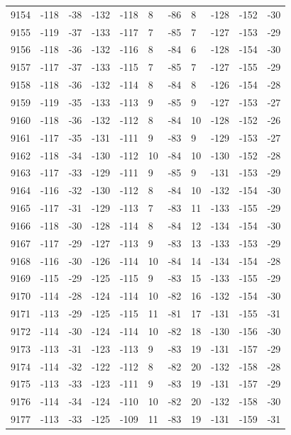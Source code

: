 \begin{table}[H]
\begin{tabular}{lllllllllll}
9154 & -118 & -38 & -132 & -118 & 8 & -86 & 8 & -128 & -152 & -30 \\
9155 & -119 & -37 & -133 & -117 & 7 & -85 & 7 & -127 & -153 & -29 \\
9156 & -118 & -36 & -132 & -116 & 8 & -84 & 6 & -128 & -154 & -30 \\
9157 & -117 & -37 & -133 & -115 & 7 & -85 & 7 & -127 & -155 & -29 \\
9158 & -118 & -36 & -132 & -114 & 8 & -84 & 8 & -126 & -154 & -28 \\
9159 & -119 & -35 & -133 & -113 & 9 & -85 & 9 & -127 & -153 & -27 \\
9160 & -118 & -36 & -132 & -112 & 8 & -84 & 10 & -128 & -152 & -26 \\
9161 & -117 & -35 & -131 & -111 & 9 & -83 & 9 & -129 & -153 & -27 \\
9162 & -118 & -34 & -130 & -112 & 10 & -84 & 10 & -130 & -152 & -28 \\
9163 & -117 & -33 & -129 & -111 & 9 & -85 & 9 & -131 & -153 & -29 \\
9164 & -116 & -32 & -130 & -112 & 8 & -84 & 10 & -132 & -154 & -30 \\
9165 & -117 & -31 & -129 & -113 & 7 & -83 & 11 & -133 & -155 & -29 \\
9166 & -118 & -30 & -128 & -114 & 8 & -84 & 12 & -134 & -154 & -30 \\
9167 & -117 & -29 & -127 & -113 & 9 & -83 & 13 & -133 & -153 & -29 \\
9168 & -116 & -30 & -126 & -114 & 10 & -84 & 14 & -134 & -154 & -28 \\
9169 & -115 & -29 & -125 & -115 & 9 & -83 & 15 & -133 & -155 & -29 \\
9170 & -114 & -28 & -124 & -114 & 10 & -82 & 16 & -132 & -154 & -30 \\
9171 & -113 & -29 & -125 & -115 & 11 & -81 & 17 & -131 & -155 & -31 \\
9172 & -114 & -30 & -124 & -114 & 10 & -82 & 18 & -130 & -156 & -30 \\
9173 & -113 & -31 & -123 & -113 & 9 & -83 & 19 & -131 & -157 & -29 \\
9174 & -114 & -32 & -122 & -112 & 8 & -82 & 20 & -132 & -158 & -28 \\
9175 & -113 & -33 & -123 & -111 & 9 & -83 & 19 & -131 & -157 & -29 \\
9176 & -114 & -34 & -124 & -110 & 10 & -82 & 20 & -132 & -158 & -30 \\
9177 & -113 & -33 & -125 & -109 & 11 & -83 & 19 & -131 & -159 & -31 \\

\end{tabular}
\end{table}
